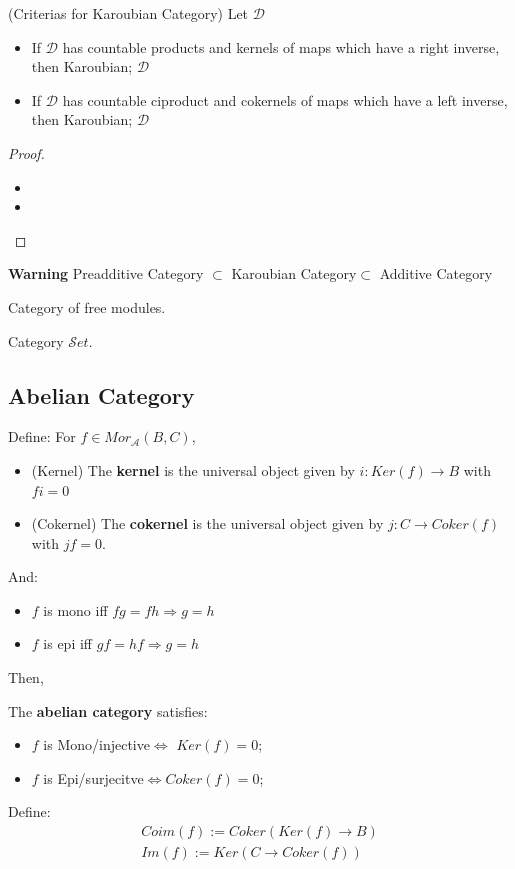 \documentclass[Total.tex]{subfiles}
\begin{document}
			\begin{proposition}
				(Criterias for Karoubian Category) Let $\mathcal{D}$
				\begin{itemize}
					\item If $\mathcal{D}$ has countable products and kernels of maps which have a right inverse, then Karoubian; $\mathcal{D}$
					\item If $\mathcal{D}$ has countable ciproduct and cokernels of maps which have a left inverse, then Karoubian; $\mathcal{D}$
				\end{itemize}
			\end{proposition}
			\begin{proof}
				\begin{itemize}
					\item 
					\item 
				\end{itemize}
			\end{proof}
			\textbf{Warning} Preadditive Category $\subset$ Karoubian Category$\subset$ Additive Category
			
			\begin{example}
				Category of free modules.
			\end{example}
			
			\begin{example}
				Category $\mathcal Set$.
			\end{example}
			\subsection{Abelian Category}
			\begin{Def}
				Define: For $f\in Mor_\mathcal{A}(B,C)$,
				\begin{itemize}
					\item (Kernel) The \textbf{kernel} is the universal object given by $i:Ker(f)\rightarrow B$ with $fi=0$
					\item (Cokernel) The \textbf{cokernel} is the universal object given by $j:C\rightarrow Coker(f)$ with $jf=0$.
				\end{itemize}
				And:
				\begin{itemize}
					\item $f$ is mono iff $fg=fh\Rightarrow g=h$
					\item $f$ is epi iff $gf=hf\Rightarrow g=h$
				\end{itemize}
			\end{Def}
			Then,
			\begin{Def}
				The \textbf{abelian category} satisfies:
				\begin{itemize}
					\item $f$ is  Mono/injective$\Leftrightarrow$ $Ker(f)=0$;
					\item $f$ is Epi/surjecitve$\Leftrightarrow Coker(f)=0$;
				\end{itemize}
			\end{Def}
			Define:
			\begin{gather*}
				Coim(f):=Coker(Ker(f)\rightarrow B)\\
				Im(f):=Ker(C\rightarrow Coker(f))
			\end{gather*}
			
\end{document}
